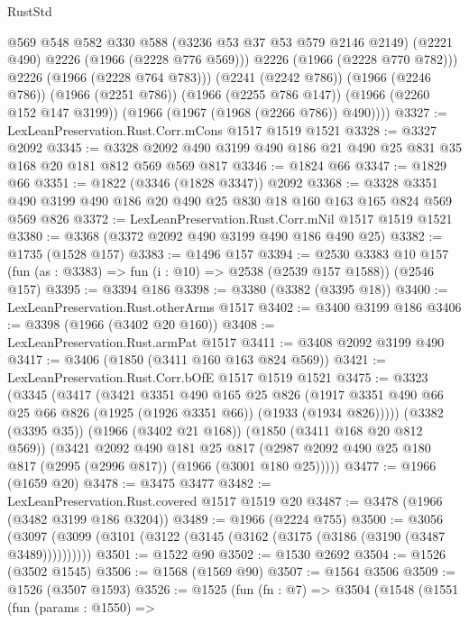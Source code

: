 \begin{lexlean}{RustStd}
\begin{coremodule}
              @569
              @548
              @582
              @330
              @588
              (@3236 @53 @37 @53 @579 @2146 @2149)
              (@2221 @490)
              @2226
              (@1966 (@2228 @776 @569)))
            @2226
            (@1966 (@2228 @770 @782)))
          @2226
          (@1966 (@2228 @764 @783)))
        (@2241 (@2242 @786))
        (@1966 (@2246 @786))
        (@1966 (@2251 @786))
        (@1966 (@2255 @786 @147))
        (@1966 (@2260 @152 @147 @3199))
        (@1966 (@1967 (@1968 (@2266 @786)) @490))))
@3327 := LexLeanPreservation.Rust.Corr.mCons @1517 @1519 @1521
@3328 := @3327 @2092
@3345 := @3328 @2092 @490 @3199 @490 @186 @21 @490 @25 @831 @35 @168 @20 @181 @812 @569 @569 @817
@3346 := @1824 @66
@3347 := @1829 @66
@3351 := @1822 (@3346 (@1828 @3347)) @2092
@3368 := @3328 @3351 @490 @3199 @490 @186 @20 @490 @25 @830 @18 @160 @163 @165 @824 @569 @569 @826
@3372 := LexLeanPreservation.Rust.Corr.mNil @1517 @1519 @1521
@3380 := @3368 (@3372 @2092 @490 @3199 @490 @186 @490 @25)
@3382 := @1735 (@1528 @157)
@3383 := @1496 @157
@3394 := @2530
    @3383
    @10
    @157
    (fun (as : @3383) => fun (i : @10) => @2538 (@2539 @157 @1588))
    (@2546 @157)
@3395 := @3394 @186
@3398 := @3380 (@3382 (@3395 @18))
@3400 := LexLeanPreservation.Rust.otherArms @1517
@3402 := @3400 @3199 @186
@3406 := @3398 (@1966 (@3402 @20 @160))
@3408 := LexLeanPreservation.Rust.armPat @1517
@3411 := @3408 @2092 @3199 @490
@3417 := @3406 (@1850 (@3411 @160 @163 @824 @569))
@3421 := LexLeanPreservation.Rust.Corr.bOfE @1517 @1519 @1521
@3475 := @3323
    (@3345
      (@3417
        (@3421
          @3351
          @490
          @165
          @25
          @826
          (@1917 @3351 @490 @66 @25 @66 @826 (@1925 (@1926 @3351 @66)) (@1933 (@1934 @826)))))
      (@3382 (@3395 @35))
      (@1966 (@3402 @21 @168))
      (@1850 (@3411 @168 @20 @812 @569))
      (@3421
        @2092
        @490
        @181
        @25
        @817
        (@2987 @2092 @490 @25 @180 @817 (@2995 (@2996 @817)) (@1966 (@3001 @180 @25)))))
@3477 := @1966 (@1659 @20)
@3478 := @3475 @3477
@3482 := LexLeanPreservation.Rust.covered @1517 @1519 @20
@3487 := @3478 (@1966 (@3482 @3199 @186 @3204))
@3489 := @1966 (@2224 @755)
@3500 := @3056 (@3097 (@3099 (@3101 (@3122 (@3145 (@3162 (@3175 (@3186 (@3190 (@3487 @3489))))))))))
@3501 := @1522 @90
@3502 := @1530 @2692
@3504 := @1526 (@3502 @1545)
@3506 := @1568 (@1569 @90)
@3507 := @1564 @3506
@3509 := @1526 (@3507 @1593)
@3526 := @1525
    (fun (fn : @7) =>
    @3504
      (@1548
        (@1551
          (fun (params : @1550) =>

\end{coremodule}
\end{lexlean}
